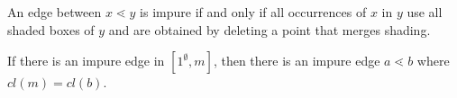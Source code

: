 \documentclass[11pt,a4paper,oneside]{article}
\begin{document}
\begin{lem}\label{lem:impureEdge}
An edge between $x\lessdot y$ is impure if and only if all occurrences of $x$ in $y$ use all shaded boxes of $y$ and are obtained by deleting a point that merges shading.
%
\end{lem}

\begin{lem}\label{lem:topImpure}
If there is an impure edge in $[1^\emptyset,m]$, then there is an impure edge $a\lessdot b$ where $cl(m)=cl(b)$.
\end{lem}
\end{document}
